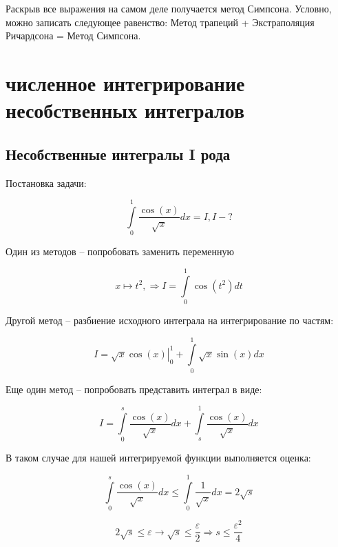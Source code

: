 \documentclass[10pt,a4paper]{article}
\begin{document}
	Раскрыв все выражения на самом деле получается метод Симпсона. Условно, 
	можно записать следующее равенство: Метод трапеций + Экстраполяция 
	Ричардсона = Метод Симпсона.
	
	\section{численное интегрирование несобственных интегралов}
	
	\subsection{Несобственные интегралы I рода}
	
	Постановка задачи:
	
	\begin{equation}
		\int\limits_{0}^{1}\frac{\cos\left(x\right)}{\sqrt{x}}dx = I, I - ?
	\end{equation}
	
	Один из методов -- попробовать заменить переменную
	
	\begin{equation}
		x \mapsto t^{2}, \Rightarrow I = \int\limits_{0}^{1}\cos\left(t^2\right)
		dt
	\end{equation}
	
	Другой метод -- разбиение исходного интеграла на интегрирование по частям:
	
	\begin{equation}
		I = \left.\sqrt{x}\cos\left(x\right)\right|_{0}^{1} + 
		\int\limits_{0}^{1}\sqrt{x}\sin\left(x\right)dx
	\end{equation}
	
	Еще один метод -- попробовать представить интеграл в виде:
	
	\begin{equation}
		I = \int\limits_{0}^{s}\frac{\cos\left(x\right)}{\sqrt{x}}dx + 
		\int\limits_{s}^{1}\frac{\cos\left(x\right)}{\sqrt{x}}dx
	\end{equation}
	
	В таком случае для нашей интегрируемой функции выполняется оценка:
	
	\begin{equation}
		\int\limits_{0}^{s}\frac{\cos\left(x\right)}{\sqrt{x}}dx\leqslant
		\int\limits_{0}^{1}\frac{1}{\sqrt{x}}dx = 2\sqrt{s}
	\end{equation}
	
	\begin{equation}
		2\sqrt{s}\leqslant \varepsilon \rightarrow \sqrt{s}\leqslant 
		\frac{\varepsilon}
		{2} \Rightarrow s \leqslant \frac{\varepsilon^{2}}{4}
	\end{equation}
	
\end{document}
